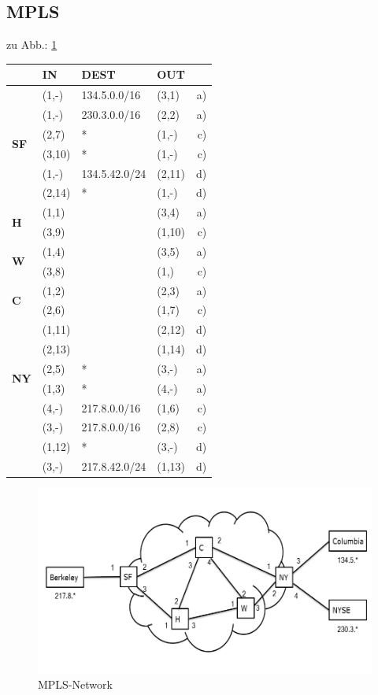 \subsection{MPLS}
zu Abb.: \ref{img:MPLS} \\
\begin{tabularx}{\textwidth}{|X|X|X|X|r|}
\hline
	&\textbf{IN}	 	&\textbf{DEST}			&\textbf{OUT} &\\
\hline
\multirow{6}{*}{\textbf{SF}}
	&(1,-)	&134.5.0.0/16	&(3,1) &a)\\ 
	&(1,-)	&230.3.0.0/16	&(2,2) &a)\\
	&(2,7)	&*				&(1,-)	&c)\\
	&(3,10)	&*				&(1,-)	&c)\\
	&(1,-)	&134.5.42.0/24	&(2,11) &d)\\
	&(2,14)	&*				&(1,-)	&d)\\
\hline
\multirow{2}{*}{\textbf{H}}
	&(1,1)	&	&(3,4) &a) \\
	&(3,9)	&	&(1,10)&c) \\
\hline
\multirow{2}{*}{\textbf{W}}
	&(1,4)	&	&(3,5) &a)\\
	&(3,8)	&	&(1,)	&c)\\
\hline
\multirow{2}{*}{\textbf{C}}
	&(1,2)	&	&(2,3) &a)\\
	&(2,6)	&	&(1,7)	&c)\\
	&(1,11)	&	&(2,12)	&d)\\
	&(2,13)	&	&(1,14)	&d)\\

\hline
\multirow{2}{*}{\textbf{NY}} 
	&(2,5)	&*		&(3,-) &a)\\
	&(1,3)	&*		&(4,-) &a)\\
	&(4,-)	&217.8.0.0/16	&(1,6) &c) \\
	&(3,-)	&217.8.0.0/16	&(2,8)	&c) \\
	&(1,12)	&*		&(3,-)	&d)\\
	&(3,-)	&217.8.42.0/24	&(1,13)&d)\\
\hline
\end{tabularx}
\begin{figure}
		\centering
		\includegraphics[width = 16cm]{./Rechnernetze/Images/4_4.png}
		\caption{MPLS-Network}
		\label{img:MPLS}
	\end{figure}
